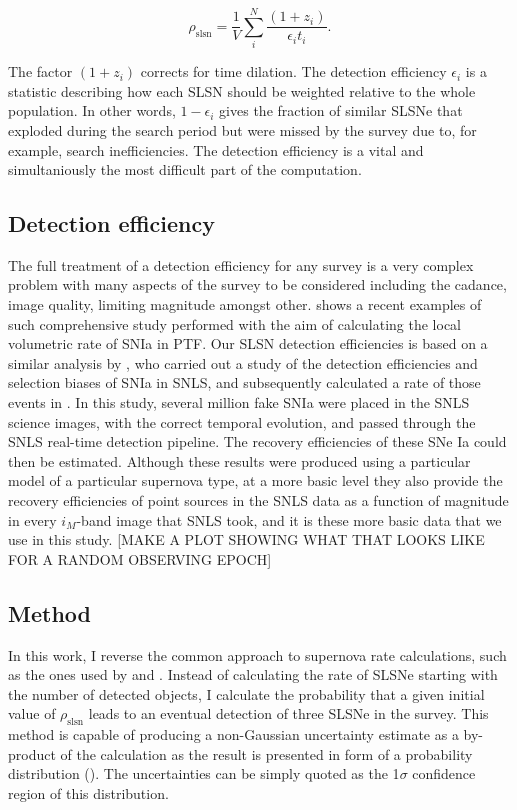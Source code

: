\begin{equation}
\label{eq:rate}
\rho_{\mathrm{slsn}} = \frac{1}{V}\sum^{N}_{i}\frac{(1+z_i)}{\epsilon_{i}t_{i}}.
\end{equation}

The factor $(1+z_i)$ corrects for time dilation. The detection efficiency $\epsilon_i$ is a statistic describing how each SLSN should be weighted relative to the whole population. In other words, $1-\epsilon_i$ gives the fraction of similar SLSNe that exploded during the search period but were missed by the survey due to, for example, search inefficiencies. The detection efficiency is a vital and simultaniously the most difficult part of the computation.

\subsection{Detection efficiency}
The full treatment of a detection efficiency for any survey is a very complex problem with many aspects of the survey to be considered including the cadance, image quality, limiting magnitude amongst other. \citet{Frohmaier2017} shows a recent examples of such comprehensive study performed with the aim of calculating the local volumetric rate of SNIa in PTF. Our SLSN detection efficiencies is based on a similar analysis by \citet{Perrett2010}, who carried out a study of the detection efficiencies and selection biases of SNIa in SNLS, and subsequently calculated a rate of those events in \cite{Perrett2012}. In this study, several million fake SNIa were placed in the SNLS science images, with the correct temporal evolution, and passed through the SNLS real-time detection pipeline. The recovery efficiencies of these SNe Ia could then be estimated. Although these results were produced using a particular model of a particular supernova type, at a more basic level they also provide the recovery efficiencies of point sources in the SNLS data as a function of magnitude in every $i_M$-band image that SNLS took, and it is these more basic data that we use in this study. [MAKE A PLOT SHOWING WHAT THAT LOOKS LIKE FOR A RANDOM OBSERVING EPOCH]

\subsection{Method}
In this work, I reverse the common approach to supernova rate calculations, such as the ones used by \citet{Perrett2012} and \citep{Frohmaier2017}. Instead of calculating the rate of SLSNe starting with the number of detected objects, I calculate the probability that a given initial value of $\rho_{\mathrm{slsn}}$ leads to an eventual detection of three SLSNe in the survey. This method is capable of producing a non-Gaussian uncertainty estimate as a by-product of the calculation as the result is presented in form of a probability distribution (). The uncertainties can be simply quoted as the 1$\sigma$ confidence region of this distribution.


